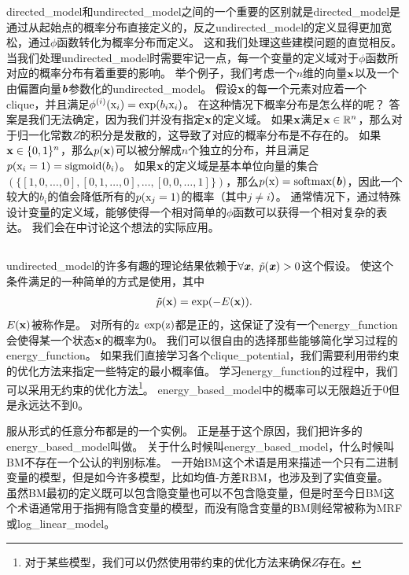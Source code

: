 \gls{directed_model}和\gls{undirected_model}之间的一个重要的区别就是\gls{directed_model}是通过从起始点的概率分布直接定义的，反之\gls{undirected_model}的定义显得更加宽松，通过$\phi$函数转化为概率分布而定义。
这和我们处理这些建模问题的直觉相反。
当我们处理\gls{undirected_model}时需要牢记一点，每一个变量的定义域对于$\phi$函数所对应的概率分布有着重要的影响。
举个例子，我们考虑一个$n$维的向量$\mathbf{x}$以及一个由偏置向量$\boldsymbol{\mathit{b}}$参数化的\gls{undirected_model}。
假设$\mathbf{x}$的每一个元素对应着一个\gls{clique}，并且满足$\phi^{(i)}(\mathrm{x}_i) = \exp(b_i\mathrm{x}_i)$。
在这种情况下概率分布是怎么样的呢？
答案是我们无法确定，因为我们并没有指定$\mathbf{x}$的定义域。
如果$\mathbf{x}$满足$\mathbf{x} \in \mathbb{R}^n$，那么对于归一化常数$Z$的积分是发散的，这导致了对应的概率分布是不存在的。
如果$\mathbf{x}\in\{0,1\}^n$，那么$p(\mathbf{x})$可以被分解成$n$个独立的分布，并且满足$p(\mathrm{x}_i=1) = \text{sigmoid}(b_i)$。
如果$\mathbf{x}$的定义域是基本单位向量的集合$(\{[1,0,\ldots,0],[0,1,\ldots,0],\ldots,[0,0,\ldots,1]\})$，那么$p(\mathrm{x}) = \text{softmax}(\boldsymbol{\mathit{b}})$，因此一个较大的$b_i$的值会降低所有的$p(\mathrm{x}_j = 1)$的概率（其中$j\neq i$）。
通常情况下，通过特殊设计变量的定义域，能够使得一个相对简单的$\phi$函数可以获得一个相对复杂的表达。
我们会在中讨论这个想法的实际应用。


\subsection{}
\label{sec:energy_based_models}


\gls{undirected_model}的许多有趣的理论结果依赖于$\forall \boldsymbol{\mathit{x}},\ \tilde{p}(\boldsymbol{\mathit{x}})>0$这个假设。
使这个条件满足的一种简单的方式是使用，其中
\begin{align}
\label{eqn:167}
\tilde{p}(\mathbf{x}) = \exp(-E(\mathbf{x})).
\end{align}
$E(\mathbf{x})$被称作是。
对所有的$\mathrm{z}$ $\exp(\mathrm{z})$都是正的，这保证了没有一个\gls{energy_function}会使得某一个状态$\mathbf{x}$的概率为$0$。
我们可以很自由的选择那些能够简化学习过程的\gls{energy_function}。
如果我们直接学习各个\gls{clique_potential}，我们需要利用带约束的优化方法来指定一些特定的最小概率值。
学习\gls{energy_function}的过程中，我们可以采用无约束的优化方法\footnote{对于某些模型，我们可以仍然使用带约束的优化方法来确保$Z$存在。}。
\gls{energy_based_model}中的概率可以无限趋近于$0$但是永远达不到$0$。


服从形式的任意分布都是的一个实例。
正是基于这个原因，我们把许多的\gls{energy_based_model}叫做\citep{Fahlman83,Ackley85,Hinton84,Hinton86a}。
关于什么时候叫\gls{energy_based_model}，什么时候叫\gls{BM}不存在一个公认的判别标准。
一开始\gls{BM}这个术语是用来描述一个只有二进制变量的模型，但是如今许多模型，比如均值-方差\gls{RBM}，也涉及到了实值变量。
虽然\gls{BM}最初的定义既可以包含隐变量也可以不包含隐变量，但是时至今日\gls{BM}这个术语通常用于指拥有隐含变量的模型，而没有隐含变量的\gls{BM}则经常被称为\gls{MRF}或\gls{log_linear_model}。



